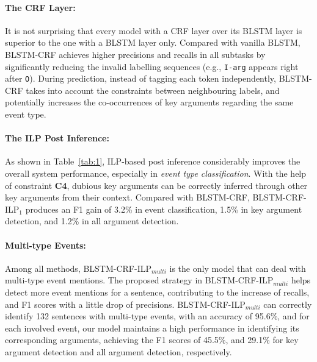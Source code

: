 
\paragraph{The CRF Layer:}
It is not surprising that  every model with a CRF layer over its BLSTM layer is superior to the one with a BLSTM layer only. Compared with vanilla BLSTM, BLSTM-CRF achieves higher precisions and recalls in all subtasks by significantly reducing the invalid labelling sequences (e.g., \texttt{I-arg} appears right after \texttt{O}). During prediction, instead of tagging each token independently, BLSTM-CRF takes into account the constraints between neighbouring labels, and potentially increases the co-occurrences of key arguments regarding the same event type. %

\paragraph{The ILP Post Inference:}
As shown in Table~\ref{tab:1}, ILP-based post inference considerably improves the overall system performance, especially in \textit{event type classification}. With the help of constraint \textbf{C4},  dubious key arguments can be correctly inferred through other key arguments from their context. Compared with BLSTM-CRF, BLSTM-CRF-ILP$_1$ produces an F1 gain of 3.2\% in event classification, 1.5\% in key argument detection, and 1.2\% in all argument detection. %

\paragraph{Multi-type Events:}
Among all methods, BLSTM-CRF-ILP$_{multi}$ is the only model that can deal with multi-type event mentions. %
The proposed strategy in BLSTM-CRF-ILP$_{multi}$ helps detect more event mentions for a sentence, contributing to the increase of recalls, and F1 scores with a little drop of precisions.
BLSTM-CRF-ILP$_{multi}$ can correctly identify 132 sentences with multi-type events,
with an accuracy of 95.6\%, and for each involved event, our model maintains a high
performance in identifying its corresponding arguments, achieving the F1 scores of 45.5\%, and 29.1\% for key argument detection and all argument detection, respectively.

